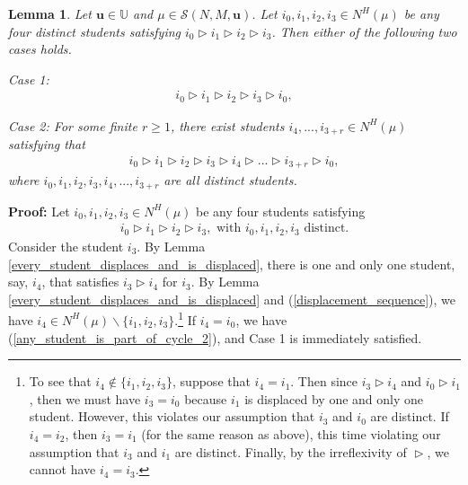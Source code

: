 \documentclass[12pt, fullpage]{amsart}
\newtheorem{lemma}{Lemma}[section]
\theoremstyle{definition}
\theoremstyle{definition}
\theoremstyle{definition}
\begin{document}
\begin{bibunit}[econometrica]
\begin{lemma}\label{any_student_is_part_of_cycle}
	Let $\boldsymbol{u}\in \mathbb{U}$ and $\mu \in  \mathcal{S}(N,M,\boldsymbol{u})$. Let $i_{0},i_{1},i_{2},i_{3} \in N^{H}(\mu)$ be any four distinct students satisfying $	i_{0}\vartriangleright i_{1}\vartriangleright i_{2}\vartriangleright i_{3}$. Then either of the following two cases holds.
	
Case 1:
	\begin{align}\label{any_student_is_part_of_cycle_2}
		i_{0}\vartriangleright i_{1}\vartriangleright i_{2}\vartriangleright i_{3}\vartriangleright i_{0},
	\end{align}

Case 2: For some finite $r\geq 1$, there exist students $i_{4},...,i_{3+r}\in N^{H}(\mu)$ satisfying that
	\begin{align}\label{any_student_is_part_of_a_cycle_3}
		i_{0}\vartriangleright i_{1}\vartriangleright i_{2}\vartriangleright i_{3}\vartriangleright i_{4}\vartriangleright ...\vartriangleright i_{3+r} \vartriangleright i_{0},
	\end{align}
where $i_{0},i_{1},i_{2},i_{3},i_{4},...,i_{3+r}$ are all distinct students.
\end{lemma}
\noindent \textbf{Proof: }
	 Let $i_{0},i_{1},i_{2},i_{3} \in N^{H}(\mu)$ be any four students satisfying 
	\begin{align}\label{displacement_sequence}
	i_{0}\vartriangleright i_{1}\vartriangleright i_{2}\vartriangleright i_{3}, \text{ with }i_{0},i_{1},i_{2},i_{3}\text{ distinct.}
\end{align}
	Consider the student $i_{3}$. By Lemma \ref{every_student_displaces_and_is_displaced}, there is one and only one student, say, $i_{4}$, that satisfies $i_{3}\vartriangleright i_{4}$ for $i_{3}$. By Lemma \ref{every_student_displaces_and_is_displaced} and   (\ref{displacement_sequence}), we have $i_{4} \in N^{H}(\mu)\backslash\{i_{1},i_{2},i_3\}$.\footnote{To see that $i_4 \notin \{i_1,i_2,i_3\}$, suppose that $i_4=i_1$. Then since $i_3 \vartriangleright i_4$ and $i_0 \vartriangleright i_1$, then we must have $i_3=i_0$ because $i_1$ is displaced by one and only one student. However, this violates our assumption that $i_3$ and $i_0$ are distinct. If $i_4=i_2$, then $i_3=i_1$ (for the same reason as above), this time violating our assumption that $i_3$ and $i_1$ are distinct. Finally, by the irreflexivity of $\vartriangleright$, we cannot have $i_4=i_3$.} If $i_{4}=i_{0}$, we have (\ref{any_student_is_part_of_cycle_2}), and Case 1 is immediately satisfied. 


\end{bibunit}
\end{document}
